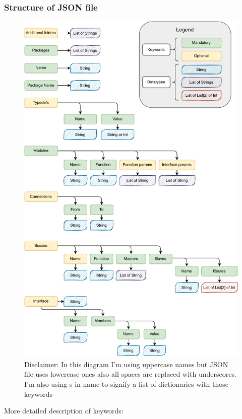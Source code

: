 \documentclass[12pt]{report}
\begin{document}
\subsubsection{Structure of JSON file}
\begin{figure}[!h]
    \centering
    
    \includegraphics[width=0.75\columnwidth]{pdfExports/LargeMapJSON.pdf}
    \caption{Disclaimer: In this diagram I'm using uppercase names but JSON file uses lowercase ones also all spaces are replaced with underscores. I'm also using s in name to signify a list of dictionaries with those keywords}
\end{figure}
\newpage
More detailed description of keywords:
\end{document}
